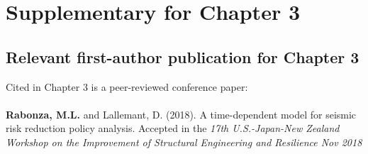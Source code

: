\setcounter{chapter}{1}

\chapter{Supplementary for Chapter 3} \label{app-time}

\section{Relevant first-author publication for Chapter 3} \label{app-time-paper}

Cited in Chapter 3 is a peer-reviewed conference paper:
\\ \\ \noindent
\textbf{Rabonza, M.L.} and Lallemant, D. (2018). A time-dependent model for seismic risk reduction policy analysis. Accepted in the \textit{17th U.S.-Japan-New Zealand Workshop on the Improvement of Structural Engineering and Resilience Nov 2018}

